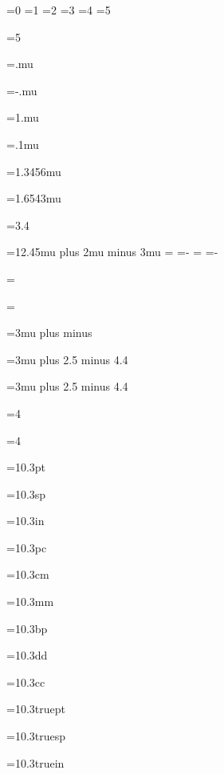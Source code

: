 
=0
=1
=2
=3
=4
=5

=5
\showthe{}

=.mu
\showthe{}

=-.mu
\showthe{}

=1.mu
\showthe{}

=.1mu
\showthe{}

=1.3456mu
\showthe{}

=1.6543mu
\showthe{}

=3.4
\showthe{}

=12.45mu plus 2mu minus 3mu
\showthe{}
=
\showthe{}
=-
\showthe{}
=
\showthe{}
=-
\showthe{}

=
\showthe{}

=
\showthe{}

=3mu plus  minus 
\showthe{}

=3mu plus 2.5 minus 4.4
\showthe{}

=3mu plus 2.5 minus 4.4
\showthe{}

=4
\showthe{}

=4
\showthe{}

=10.3pt
\showthe{}

=10.3sp
\showthe{}

=10.3in
\showthe{}

=10.3pc
\showthe{}

=10.3cm
\showthe{}

=10.3mm
\showthe{}

=10.3bp
\showthe{}

=10.3dd
\showthe{}

=10.3cc
\showthe{}


=10.3truept
\showthe{}

=10.3truesp
\showthe{}

=10.3truein
\showthe{}

